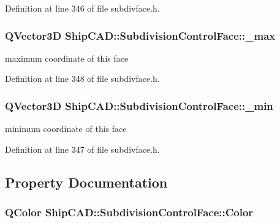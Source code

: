 Definition at line 346 of file subdivface.\-h.

\hypertarget{classShipCAD_1_1SubdivisionControlFace_a22411574593283209772872bc740535b}{
\subsubsection[{\-\_\-max}]{\setlength{\rightskip}{0pt plus 5cm}Q\-Vector3\-D Ship\-C\-A\-D\-::\-Subdivision\-Control\-Face\-::\-\_\-max\hspace{0.3cm}{\ttfamily [protected]}}}\label{classShipCAD_1_1SubdivisionControlFace_a22411574593283209772872bc740535b}
maximum coordinate of this face 

Definition at line 348 of file subdivface.\-h.

\hypertarget{classShipCAD_1_1SubdivisionControlFace_aac4f577da0f5203059901c5e09814e1d}{
\subsubsection[{\-\_\-min}]{\setlength{\rightskip}{0pt plus 5cm}Q\-Vector3\-D Ship\-C\-A\-D\-::\-Subdivision\-Control\-Face\-::\-\_\-min\hspace{0.3cm}{\ttfamily [protected]}}}\label{classShipCAD_1_1SubdivisionControlFace_aac4f577da0f5203059901c5e09814e1d}
minimum coordinate of this face 

Definition at line 347 of file subdivface.\-h.



\subsection{Property Documentation}
\hypertarget{classShipCAD_1_1SubdivisionControlFace_a7fbca8373f94937bcde294cbd41c70e4}{
\subsubsection[{Color}]{\setlength{\rightskip}{0pt plus 5cm}Q\-Color Ship\-C\-A\-D\-::\-Subdivision\-Control\-Face\-::\-Color\hspace{0.3cm}{\ttfamily [read]}}}\label{classShipCAD_1_1SubdivisionControlFace_a7fbca8373f94937bcde294cbd41c70e4}


